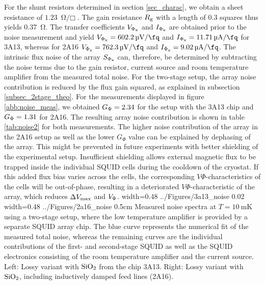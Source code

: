For the shunt resistors determined in section \ref{sec_charac}, we obtain a sheet resistance of $\qty{1.23}{\ohm\per\Box}$. The gain resistance $R_{\rm g}$ with a length of 0.3 squares thus yields \qty{0.37}{\ohm}. The transfer coefficients $V_{\rm \Phi_x}$ and $I_{\rm \Phi_x}$ are obtained prior to the noise measurement and yield $V_{\rm \Phi_x}=\qty{602.2}{\micro\volt\per\fq}$ and $I_{\rm \Phi_x}=\qty{11.71}{\micro\ampere\per\fq}$ for 3A13, whereas for 2A16 $V_{\rm \Phi_x}=\qty{762.3}{\micro\volt\per\fq}$ and $I_{\rm \Phi_x}=\qty{9.02}{\micro\ampere\per\fq}$. The intrinsic flux noise of the array $S_{\rm \Phi_x}$ can, therefore, be determined by subtracting the noise terms due to the gain resistor, current source and room temperature amplifier from the measured total noise. For the two-stage setup, the array noise contribution is reduced by the flux gain squared, as explained in subsection \ref{subsec_2stage_theo}. For the measurements displayed in figure \ref{abb:noise_meas}, we obtained $G_{\rm \Phi}=2.34$ for the setup with the 3A13 chip and $G_{\rm \Phi}=1.31$ for 2A16. The resulting array noise contribution is shown in table \ref{tab:noise2} for both measurements. 
The higher noise contribution of the array in the 2A16 setup as well as the lower $G_\Phi$ value can be explained by dephasing of the array. This might be prevented in future experiments with better shielding of the experimental setup. Insufficient shielding allows external magnetic flux to be trapped inside the individual SQUID cells during the cooldown of the cryostat. If this added flux bias varies across the cells, the corresponding $V\Phi$-characteristics of the cells will be out-of-phase, resulting in a deteriorated $V\Phi$-characteristic of the array, which reduces $\Delta V_{\rm max}$ and $V_{\rm \Phi}$.
{width=0.48\textwidth}
{../Figures/3a13_noise}
{0.02\textwidth} %
{width=0.48\textwidth}
{../Figures/2a16_noise}
{0.5cm} %
{Measured noise spectra at $T=\qty{10}{\milli\kelvin}$ using a two-stage setup, where the low temperature amplifier is provided by a separate SQUID array chip. The blue curve represents the numerical fit of the measured total noise, whereas the remaining curves are the individual contributions of the first- and second-stage SQUID as well as the SQUID electronics consisting of the room temperature amplifier and the current source. Left: Lossy variant with ${\rm SiO_2}$ from the chip 3A13. Right: Lossy variant with ${\rm SiO_2}$, including inductively damped feed lines (2A16).}
